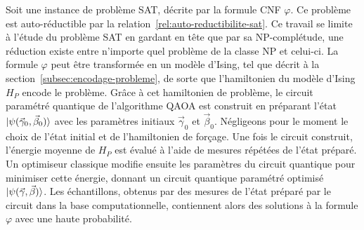 Soit une instance de problème SAT, décrite par la formule CNF $\varphi$. Ce problème est auto-réductible par la relation~\ref{rel:auto-reductibilite-sat}. Ce travail se limite à l'étude du problème SAT en gardant en tête que par sa \textsf{NP}-complétude, une réduction existe entre n'importe quel problème de la classe \textsf{NP} et celui-ci. La formule $\varphi$ peut être transformée en un modèle d'Ising, tel que décrit à la section~\ref{subsec:encodage-probleme}, de sorte que l'hamiltonien du modèle d'Ising $H_{P}$ encode le problème. Grâce à cet hamiltonien de problème, le circuit paramétré quantique de l'algorithme QAOA est construit en préparant l'état $\ket{\psi(\vec{\gamma}_{0}, \vec{\beta}_{0})}$ avec les paramètres initiaux $\vec{\gamma}_0$ et $\vec{\beta}_{0}$. Négligeons pour le moment le choix de l'état initial et de l'hamiltonien de forçage. Une fois le circuit construit, l'énergie moyenne de $H_{P}$ est évalué à l'aide de mesures répétées de l'état préparé. Un optimiseur classique modifie ensuite les paramètres du circuit quantique pour minimiser cette énergie, donnant un circuit quantique paramétré optimisé $\ket{\psi(\vec{\gamma}, \vec{\beta})}$.
Les échantillons, obtenus par des mesures de l'état préparé par le circuit dans la base computationnelle, contiennent alors des solutions à la formule $\varphi$ avec une haute probabilité.

